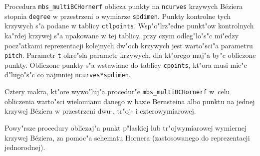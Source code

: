 \vspace{\bigskipamount}
Procedura \texttt{mbs\_multiBCHornerf} oblicza punkty na \texttt{ncurves}
krzywych B\'{e}ziera stopnia \texttt{degree} w przestrzeni o wymiarze
\texttt{spdimen}. Punkty kontrolne tych krzywych s"a podane w tablicy
\texttt{ctlpoints}. Wsp"o"lrz"edne punkt"ow kontrolnych ka"rdej krzywej
s"a upakowane w tej tablicy, przy czym odleg"lo"s"c mi"edzy pocz"atkami
reprezentacji kolejnych dw"och krzywych jest warto"sci"a parametru
\texttt{pitch}.
Parametr \texttt{t} okre"sla parametr krzywych,
dla kt"orego maj"a by"c obliczone punkty. Obliczone punkty s"a wstawiane do
tablicy \texttt{cpoints}, kt"ora musi mie"c d"lugo"s"c co najmniej
\texttt{ncurves*spdimen}.

\vspace{\bigskipamount}
Cztery makra, kt"ore wywo"luj"a procedur"e \texttt{mbs\_multiBCHornerf}
w~celu obliczenia warto"sci wielomianu danego w bazie Bernsteina albo punktu
na jednej krzywej B\'{e}ziera w przestrzeni dwu-, tr"oj- i czterowymiarowej.

\vspace{\bigskipamount}
Powy"rsze procedury obliczaj"a punkt p"laskiej lub tr"ojwymiarowej wymiernej
krzywej B\'{e}ziera, za pomoc"a schematu Hornera (zastosowanego do
reprezentacji jednorodnej).

